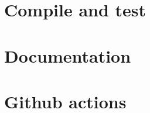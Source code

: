 \newpage

\section{Compile and test}
\label{compile}

	

\newpage

\section{Documentation}
\label{doc}

\section{Github actions}
\label{ci}